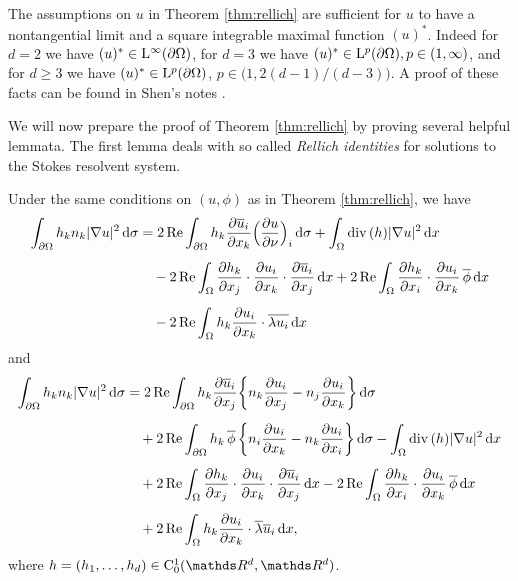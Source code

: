 \begin{rem}
  \label{rem:shenNontangential}
  The assumptions on $u$ in Theorem \ref{thm:rellich} are sufficient for $u$ to have a nontangential limit and a square integrable maximal function $(u)^*$. 
  Indeed for $d = 2$ we have $(u)^* \in \mathrm{L}^\infty(\partial\Omega)$, for $d = 3$ we have $(u)^* \in \mathrm{L}^p(\partial\Omega), p \in (1,\infty)$, and for $d \geq 3$ we have $(u)^* \in \mathrm{L}^p(\partial\Omega)$, $p \in \big(1, 2 (d - 1) / (d - 3) \big)$.
  A proof of these facts can be found in Shen's notes \cite[Prop. 7.1.3]{Shen2017}.
\end{rem}

We will now prepare the proof of Theorem \ref{thm:rellich} by proving several helpful lemmata.
The first lemma deals with so called \emph{Rellich identities} for solutions to the Stokes resolvent system.

\begin{lem}
  \label{lem:rellichIdentity}
  Under the same conditions on $(u,\phi)$ as in Theorem \ref{thm:rellich}, we have
  \begin{align}
    \int_{\partial\Omega} h_k n_k |\nabla u|^2 \, {\operatorname{d}\!{\sigma}} 
    &= 2 \operatorname{Re} \int_{\partial\Omega} h_k \frac{\partial \overline u_i}{\partial x_k} \Big( \frac{\partial u}{\partial \nu} \Big)_i \, {\operatorname{d}\!{\sigma}} + \int_\Omega \mathrm{div\,} (h) |\nabla u|^2 \, {\operatorname{d}\!{x}} \nonumber\\[0.5em]
    &\quad - 2 \operatorname{Re} \int_\Omega \frac{\partial h_k}{\partial x_j} \cdot \frac{\partial u_i}{\partial x_k} \cdot \frac{\partial \overline u_i}{\partial x_j} \, {\operatorname{d}\!{x}} + 2 \operatorname{Re} \int_\Omega \frac{\partial h_k}{\partial x_i} \cdot \frac{\partial u_i}{\partial x_k} \, \overline \phi \, {\operatorname{d}\!{x}} \nonumber\\[0.5em]
    &\quad - 2 \operatorname{Re} \int_\Omega h_k \frac{\partial u_i}{\partial x_k} \cdot \overline {\lambda u_i} \, {\operatorname{d}\!{x}} \label{eq:rellichIdentity}
  \end{align}
  and
  \begin{align}
    \int_{\partial\Omega} h_k n_k |\nabla u|^2 \, {\operatorname{d}\!{\sigma}}
    &= 2\operatorname{Re} \int_{\partial\Omega} h_k \frac{\partial \overline u_i}{\partial x_j} \bigg\{ n_k \frac{\partial u_i}{\partial x_j} - n_j \frac{\partial u_i}{\partial x_k} \bigg\} \, {\operatorname{d}\!{\sigma}} \nonumber\\[0.5em]
    &\quad + 2 \operatorname{Re} \int_{\partial\Omega} h_k \, \overline \phi \, \bigg\{ n_i \frac{\partial u_i}{\partial x_k} - n_k \frac{\partial u_i}{\partial x_i} \bigg\} \, {\operatorname{d}\!{\sigma}} - \int_\Omega \mathrm{div\,} (h) |\nabla u|^2 \, {\operatorname{d}\!{x}} \nonumber\\[0.5em]
    &\quad + 2 \operatorname{Re} \int_\Omega \frac{\partial h_k}{\partial x_j} \cdot \frac{\partial u_i}{\partial x_k} \cdot \frac{\partial \overline u_i}{\partial x_j} \, {\operatorname{d}\!{x}} - 2 \operatorname{Re} \int_\Omega \frac{\partial h_k}{\partial x_i} \cdot \frac{\partial u_i}{\partial x_k} \, \overline \phi \, {\operatorname{d}\!{x}} \nonumber\\[0.5em]
    &\quad + 2 \operatorname{Re} \int_\Omega h_k \frac{\partial u_i}{\partial x_k} \cdot \overline \lambda \overline u_i \, {\operatorname{d}\!{x}}, \label{eq:rellichIdentity2}
  \end{align}
  where $h = (h_1, \dots,h_d) \in \CC_0^1(\R^d, \R^d)$.
\end{lem}

